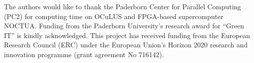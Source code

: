 \documentclass[format=acmsmall,urlbreakonhyphens]{acmart}
\begin{document}

\begin{acks}
The authors would like to thank the Paderborn Center for Parallel Computing (PC2) for computing time on OCuLUS and FPGA-based supercomputer NOCTUA. Funding from the Paderborn University's research award for ``Green IT'' is kindly acknowledged. This project has received funding from the European Research Council (ERC) under the European Union's Horizon 2020 research and innovation programme (grant agreement No 716142).
\end{acks}



\end{document}
